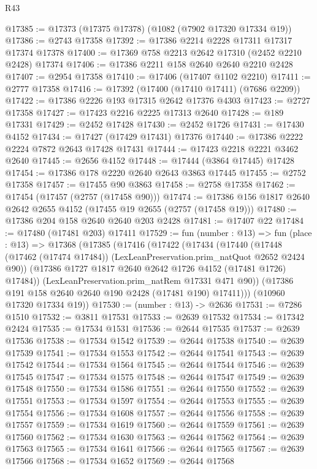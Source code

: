 \begin{lexlean}{R43}
\begin{coremodule}
@17385 := @17373 (@17375 @17378) (@1082 (@7902 @17320 @17334 @19))
@17386 := @2743 @17358
@17392 := @17386 @2214 @2228 @17311 @17317 @17374 @17378
@17400 := @17369 @758 @2213 @2642 @17310 (@2452 @2210 @2428) @17374
@17406 := @17386 @2211 @158 @2640 @2640 @2210 @2428
@17407 := @2954 @17358
@17410 := @17406 (@17407 @1102 @2210)
@17411 := @2777 @17358
@17416 := @17392 (@17400 (@17410 @17411) (@7686 @2209))
@17422 := @17386 @2226 @193 @17315 @2642 @17376 @4303
@17423 := @2727 @17358
@17427 := @17423 @2216 @2225 @17313 @2640
@17428 := @189 @17331
@17429 := @2452 @17428
@17430 := @2452 @1726
@17431 := @17430 @4152
@17434 := @17427 (@17429 @17431) @17376
@17440 := @17386 @2222 @2224 @7872 @2643 @17428 @17431
@17444 := @17423 @2218 @2221 @3462 @2640
@17445 := @2656 @4152
@17448 := @17444 (@3864 @17445) @17428
@17454 := @17386 @178 @2220 @2640 @2643 @3863 @17445
@17455 := @2752 @17358
@17457 := @17455 @90 @3863
@17458 := @2758 @17358
@17462 := @17454 (@17457 (@2757 (@17458 @90)))
@17474 := @17386 @156 @1817 @2640 @2642 @2655 @4152 (@17455 @19 @2655 (@2757 (@17458 @19)))
@17480 := @17386 @204 @158 @2640 @2640 @203 @2428
@17481 := @17407 @22
@17484 := @17480 (@17481 @203) @17411
@17529 := fun (number : @13) =>
  fun (place : @13) =>
  @17368
    (@17385
      (@17416
        (@17422
          (@17434
            (@17440
              (@17448 (@17462 (@17474 @17484)) (LexLeanPreservation.prim_natQuot @2652 @2424 @90))
              (@17386 @1727 @1817 @2640 @2642 @1726 @4152 (@17481 @1726) @17484))
            (LexLeanPreservation.prim_natRem @17331 @471 @90))
          (@17386 @191 @158 @2640 @2640 @190 @2428 (@17481 @190) @17411)))
      (@10960 @17320 @17334 @19))
@17530 := (number : @13) -> @2636
@17531 := @7286 @1510
@17532 := @3811 @17531
@17533 := @2639 @17532
@17534 := @17342 @2424
@17535 := @17534 @1531
@17536 := @2644 @17535
@17537 := @2639 @17536
@17538 := @17534 @1542
@17539 := @2644 @17538
@17540 := @2639 @17539
@17541 := @17534 @1553
@17542 := @2644 @17541
@17543 := @2639 @17542
@17544 := @17534 @1564
@17545 := @2644 @17544
@17546 := @2639 @17545
@17547 := @17534 @1575
@17548 := @2644 @17547
@17549 := @2639 @17548
@17550 := @17534 @1586
@17551 := @2644 @17550
@17552 := @2639 @17551
@17553 := @17534 @1597
@17554 := @2644 @17553
@17555 := @2639 @17554
@17556 := @17534 @1608
@17557 := @2644 @17556
@17558 := @2639 @17557
@17559 := @17534 @1619
@17560 := @2644 @17559
@17561 := @2639 @17560
@17562 := @17534 @1630
@17563 := @2644 @17562
@17564 := @2639 @17563
@17565 := @17534 @1641
@17566 := @2644 @17565
@17567 := @2639 @17566
@17568 := @17534 @1652
@17569 := @2644 @17568

\end{coremodule}
\end{lexlean}
